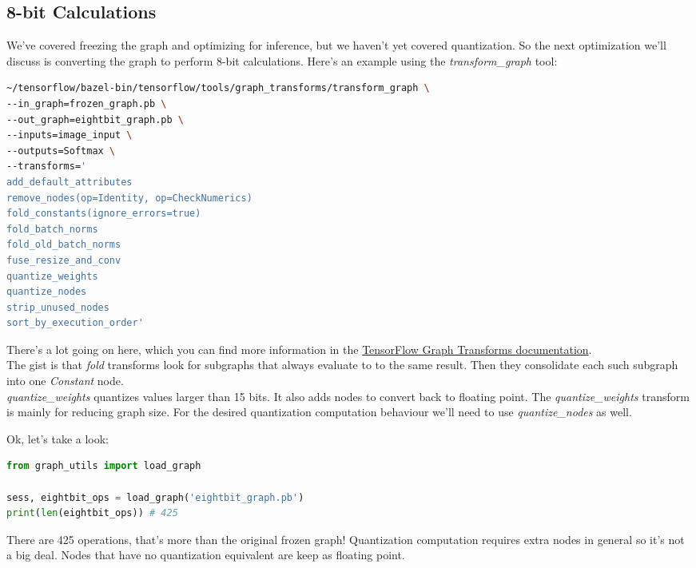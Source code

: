\documentclass[12pt, draft]{report}
\begin{document}
\subsection*{8-bit Calculations}
\begin{changemargin}{0.5cm}{2.0cm}
We’ve covered freezing the graph and optimizing for inference, but we haven’t yet covered quantization. So the next
optimization we’ll discuss is converting the graph to perform 8-bit calculations. Here’s an example using the
\textit{transform\_graph} tool:
\begin{lstlisting}[language=Bash]
~/tensorflow/bazel-bin/tensorflow/tools/graph_transforms/transform_graph \
--in_graph=frozen_graph.pb \
--out_graph=eightbit_graph.pb \
--inputs=image_input \
--outputs=Softmax \
--transforms='
add_default_attributes
remove_nodes(op=Identity, op=CheckNumerics)
fold_constants(ignore_errors=true)
fold_batch_norms
fold_old_batch_norms
fuse_resize_and_conv
quantize_weights
quantize_nodes
strip_unused_nodes
sort_by_execution_order'
\end{lstlisting}
There’s a lot going on here, which you can find more information in the
\href{https://github.com/tensorflow/tensorflow/blob/master/tensorflow/tools/graph_transforms/README.md}{TensorFlow Graph Transforms documentation}.\vspace{0.5cm}\\
The gist is that \textit{fold} transforms look for subgraphs that always evaluate to to the same result.
Then they consolidate each such subgraph into one \textit{Constant} node.\vspace{0.5cm}\\
\textit{quantize\_weights} quantizes values larger than 15 bits. It also adds nodes to convert back to floating point.
The \textit{quantize\_weights} transform is mainly for reducing graph size. For the desired quantization computation
behaviour we’ll need to use \textit{quantize\_nodes} as well.

Ok, let’s take a look:
\begin{lstlisting}[language=Python]
from graph_utils import load_graph

sess, eightbit_ops = load_graph('eightbit_graph.pb')
print(len(eightbit_ops)) # 425
\end{lstlisting}
There are 425 operations, that’s more than the original frozen graph! Quantization computation requires extra
nodes in general so it’s not a big deal. Nodes that have no quantization equivalent are keep as floating point.
\end{changemargin}
\end{document}
